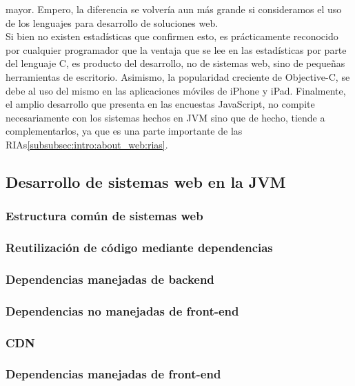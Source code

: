 mayor. Empero, la diferencia se volvería aun más grande si consideramos el uso de los
lenguajes para desarrollo de soluciones web.\\
Si bien no existen estadísticas que confirmen esto, es prácticamente reconocido por
cualquier programador que la ventaja que se lee en las estadísticas por parte del lenguaje
C, es producto del desarrollo, no de sistemas web, sino de pequeñas herramientas de
escritorio. Asimismo, la popularidad creciente de Objective-C, se debe al uso del mismo en
las aplicaciones móviles de iPhone y iPad. Finalmente, el amplio desarrollo que presenta en
las encuestas JavaScript, no compite necesariamente con los sistemas hechos en JVM sino que
de hecho, tiende a complementarlos, ya que es una parte importante de las
RIAs\ref{subsubsec:intro:about_web:rias}.\\

\subsection{Desarrollo de sistemas web en la JVM}
\label{subsec:intro:jvm_dev}

\subsubsection{Estructura común de sistemas web}
\label{susubbsec:intro:jvm_dev:structure}

\subsubsection{Reutilización de código mediante dependencias}
\label{susubbsec:intro:jvm_dev:dependencies}

\subsubsection{Dependencias manejadas de backend}
\label{susubbsec:intro:jvm_dev:backend_dependencies}

\subsubsection{Dependencias no manejadas de front-end}
\label{susubbsec:intro:jvm_dev:frontend_dependencies}

\subsubsection{CDN}
\label{susubbsec:intro:jvm_dev:cdns}

\subsubsection{Dependencias manejadas de front-end}
\label{susubbsec:intro:jvm_dev:frontend_managed}

